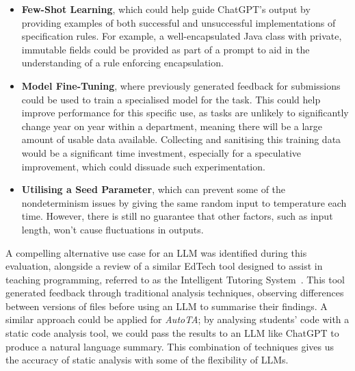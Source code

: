\begin{itemize}
    \item \textbf{Few-Shot Learning}, which could help guide ChatGPT's output by providing examples of both successful and unsuccessful implementations of specification rules. For example, a well-encapsulated Java class with private, immutable fields could be provided as part of a prompt to aid in the understanding of a rule enforcing encapsulation.
    \item \textbf{Model Fine-Tuning}, where previously generated feedback for submissions could be used to train a specialised model for the task. This could help improve performance for this specific use, as tasks are unlikely to significantly change year on year within a department, meaning there will be a large amount of usable data available. Collecting and sanitising this training data would be a significant time investment, especially for a speculative improvement, which could dissuade such experimentation.
    \item \textbf{Utilising a Seed Parameter}, which can prevent some of the nondeterminism issues by giving the same random input to temperature each time. However, there is still no guarantee that other factors, such as input length, won't cause fluctuations in outputs.
\end{itemize}

A compelling alternative use case for an LLM was identified during this evaluation, alongside a review of a similar EdTech tool designed to assist in teaching programming, referred to as the Intelligent Tutoring System~\cite{IntelligentTutoring}. This tool generated feedback through traditional analysis techniques, observing differences between versions of files before using an LLM to summarise their findings. A similar approach could be applied for \emph{AutoTA}; by analysing students' code with a static code analysis tool, we could pass the results to an LLM like ChatGPT to produce a natural language summary. This combination of techniques gives us the accuracy of static analysis with some of the flexibility of LLMs.